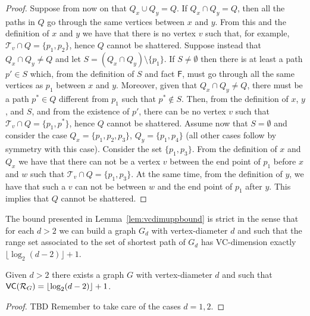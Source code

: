 \begin{proof}
  Suppose from now on that $Q_x\cup Q_y=Q$.
  If $Q_x\cap Q_y=Q$, then all the paths in $Q$ go through the same vertices
  between $x$ and $y$. From this and the definition of $x$ and $y$ we have
  that there is no vertex $v$ such that, for example, $\mathcal{T}_v\cap Q=\{p_1,p_2\}$, hence
  $Q$ cannot be shattered. Suppose instead that $Q_x\cap Q_y\neq Q$ and let
  $S=(Q_x\cap Q_y)\setminus\{p_1\}$. If $S\neq\emptyset$ then there is at least
  a path $p'\in S$ which, from the definition of $S$ and fact $\mathsf{F}$, must
  go through all the same vertices as $p_1$ between $x$ and $y$. Moreover, given that
  $Q_x\cap Q_y\neq Q$, there must be a path $p^*\in Q$ different from $p_1$ such
  that $p^*\notin S$. Then, from the definition of $x$, $y$, and $S$, and from
  the existence of $p'$, there can be no vertex $v$ such that $\mathcal{T}_v\cap
  Q=\{p_1,p^*\}$, hence $Q$ cannot be shattered. Assume now that $S=\emptyset$
  and consider the case $Q_x=\{p_1,p_2,p_3\}$, $Q_y=\{p_1,p_4\}$ (all other
  cases follow by symmetry with this case). Consider the set $\{p_1,p_3\}$. From
  the definition of $x$ and $Q_x$ we have that there can not be a vertex $v$ between the
  end point of $p_1$ before $x$ and $w$ such that
  $\mathcal{T}_v\cap Q=\{p_1,p_3\}$. At the same time, from the definition of
  $y$, we have that such a $v$ can not be between $w$ and the end point of $p_1$
  after $y$. This implies that $Q$ cannot be shattered.

\end{proof}

The bound presented in Lemma~\ref{lem:vcdimuppbound} is strict in the sense that
for each $d>2$ we can build a graph $G_d$ with vertex-diameter $d$ and such
that the range set associated to the set of shortest path of $G_d$ has
VC-dimension exactly $\lfloor\log_2(d-2)\rfloor+1$.

\begin{lemma}
  Given $d>2$ there exists a graph $G$ with vertex-diameter $d$ and such that
  $\mathsf{VC}(\mathcal{R}_G)=\lfloor\log_2(d-2)\rfloor+1$.
\end{lemma}

\begin{proof}
  \XXX TBD Remember to take care of the cases $d=1,2$.
\end{proof}

